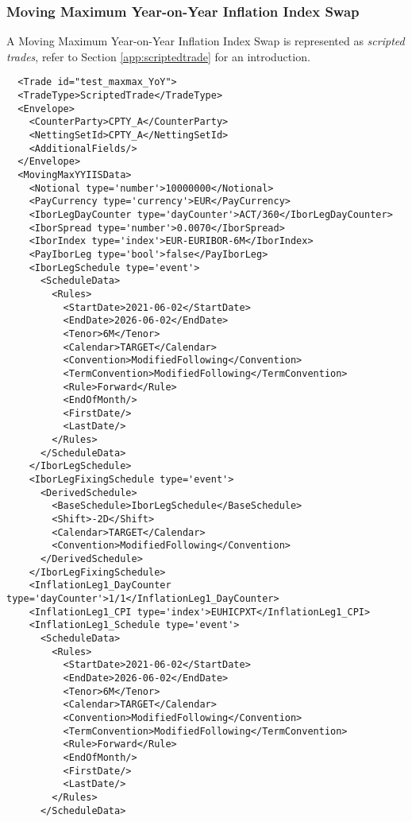 \subsubsection{Moving Maximum Year-on-Year Inflation Index Swap}


A Moving Maximum Year-on-Year Inflation Index Swap is represented as {\em scripted trades}, refer to Section
\ref{app:scriptedtrade} for an introduction.

\begin{verbatim} 
  <Trade id="test_maxmax_YoY">
  <TradeType>ScriptedTrade</TradeType>
  <Envelope>
    <CounterParty>CPTY_A</CounterParty>
    <NettingSetId>CPTY_A</NettingSetId>
    <AdditionalFields/>
  </Envelope>
  <MovingMaxYYIISData>
    <Notional type='number'>10000000</Notional>
    <PayCurrency type='currency'>EUR</PayCurrency>
    <IborLegDayCounter type='dayCounter'>ACT/360</IborLegDayCounter>
    <IborSpread type='number'>0.0070</IborSpread>
    <IborIndex type='index'>EUR-EURIBOR-6M</IborIndex>
    <PayIborLeg type='bool'>false</PayIborLeg>
    <IborLegSchedule type='event'>
      <ScheduleData>
        <Rules>
          <StartDate>2021-06-02</StartDate>
          <EndDate>2026-06-02</EndDate>
          <Tenor>6M</Tenor>
          <Calendar>TARGET</Calendar>
          <Convention>ModifiedFollowing</Convention>
          <TermConvention>ModifiedFollowing</TermConvention>
          <Rule>Forward</Rule>
          <EndOfMonth/>
          <FirstDate/>
          <LastDate/>
        </Rules>
      </ScheduleData>
    </IborLegSchedule>
    <IborLegFixingSchedule type='event'>
      <DerivedSchedule>
        <BaseSchedule>IborLegSchedule</BaseSchedule>
        <Shift>-2D</Shift>
        <Calendar>TARGET</Calendar>
        <Convention>ModifiedFollowing</Convention>
      </DerivedSchedule>
    </IborLegFixingSchedule>
    <InflationLeg1_DayCounter type='dayCounter'>1/1</InflationLeg1_DayCounter>
    <InflationLeg1_CPI type='index'>EUHICPXT</InflationLeg1_CPI>
    <InflationLeg1_Schedule type='event'>
      <ScheduleData>
        <Rules>
          <StartDate>2021-06-02</StartDate>
          <EndDate>2026-06-02</EndDate>
          <Tenor>6M</Tenor>
          <Calendar>TARGET</Calendar>
          <Convention>ModifiedFollowing</Convention>
          <TermConvention>ModifiedFollowing</TermConvention>
          <Rule>Forward</Rule>
          <EndOfMonth/>
          <FirstDate/>
          <LastDate/>
        </Rules>
      </ScheduleData>

\end{verbatim}
